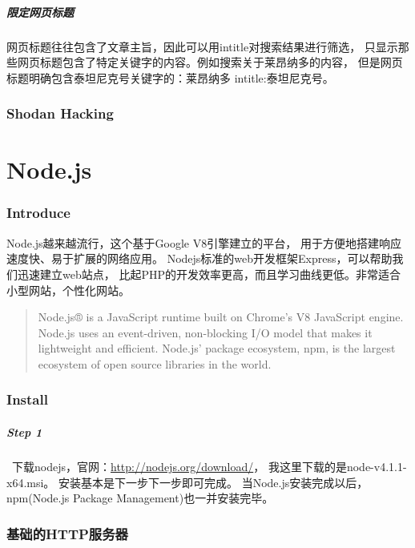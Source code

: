 \documentclass{book}
\begin{document}
\paragraph{限定网页标题}
网页标题往往包含了文章主旨，因此可以用intitle对搜索结果进行筛选，
只显示那些网页标题包含了特定关键字的内容。例如搜索关于莱昂纳多的内容，
但是网页标题明确包含泰坦尼克号关键字的：莱昂纳多 intitle:泰坦尼克号。


\subsection{Shodan Hacking}

\chapter{Node.js}

\clearpage
\mbox{}         
\clearpage

\subsection{Introduce}

Node.js越来越流行，这个基于Google V8引擎建立的平台， 
用于方便地搭建响应速度快、易于扩展的网络应用。
Nodejs标准的web开发框架Express，可以帮助我们迅速建立web站点，
比起PHP的开发效率更高，而且学习曲线更低。非常适合小型网站，个性化网站。

\begin{quotation}
Node.js® is a JavaScript runtime built on Chrome's V8 JavaScript engine. 
Node.js uses an event-driven, non-blocking I/O model that makes it lightweight and efficient. 
Node.js' package ecosystem, npm, is the largest ecosystem of open source libraries in the world.
\end{quotation}

\subsection{Install}

\paragraph{Step 1}~下载nodejs，官网：\url{http://nodejs.org/download/}，
我这里下载的是node-v4.1.1-x64.msi。
安装基本是下一步下一步即可完成。
当Node.js安装完成以后，npm(Node.js Package Management)也一并安装完毕。


\subsection{基础的HTTP服务器}
\end{document}
